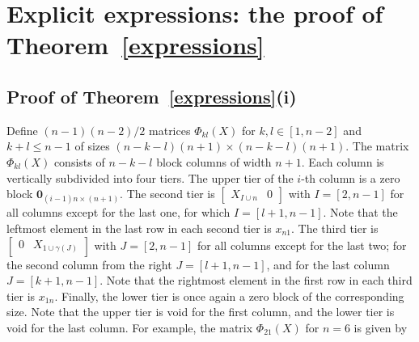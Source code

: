 \documentclass{amsart}
\theoremstyle{definition}
\theoremstyle{remark}
\numberwithin{equation}{section}
\numberwithin{theorem}{section}
\def\Nphi{{\mathsf\Phi}}
\def\zero{\mathbf 0}
\begin{document}
\section{Explicit expressions: the proof of Theorem~\ref{expressions}}\label{explicit}

\subsection{Proof of Theorem~\ref{expressions}(i)}\label{explicitphi} 
Define $(n-1)(n-2)/2$ matrices $\Nphi_{kl}(X)$ for $k,l\in[1,n-2]$ and $k+l\le n-1$ of sizes $(n-k-l)(n+1)\times (n-k-l)(n+1)$. The matrix $\Nphi_{kl}(X)$ consists of $n-k-l$ block
columns of width $n+1$. Each column is vertically subdivided into four tiers. The upper tier of the $i$-th column
is a zero block $\zero_{(i-1)n\times(n+1)}$. The second tier is $\begin{bmatrix} X_{I\cup n} & 0\end{bmatrix}$ with
$I=[2,n-1]$ for all columns except for the last one, for which $I=[l+1,n-1]$.  
Note that the leftmost element in the last row in each second tier is $x_{n1}$.
The third tier is
$\begin{bmatrix}0 & X_{1\cup\gamma(J)}\end{bmatrix}$ with $J=[2,n-1]$
for all columns except for the last two; for the second column from the right 
$J=[l+1,n-1]$, and for the last column $J=[k+1,n-1]$. Note that the rightmost element in the first row in each third tier is $x_{1n}$. 
Finally, the lower tier is once again a zero block of the corresponding size. Note that the upper tier is void for the first column, and the lower tier is void for the last column. For example, the matrix $\Nphi_{21}(X)$ for $n=6$ is given by
\end{document}
